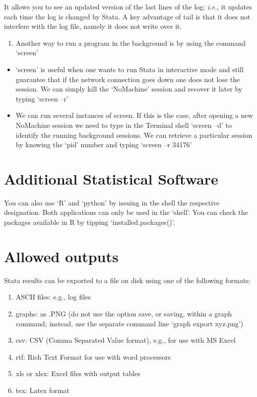 \documentclass[]{book}
\providecommand{\tightlist}{%
  \setlength{\itemsep}{0pt}\setlength{\parskip}{0pt}}
\begin{document}
It allows you to see an updated version of the last lines of the log;
\emph{i.e.}, it updates each time the log is changed by Stata. A key
advantage of tail is that it does not interfere with the log file,
namely it does not write over it.

\begin{enumerate}
\def\labelenumi{\arabic{enumi}.}
\setcounter{enumi}{14}
\tightlist
\item
  Another way to run a program in the background is by using the
  command `screen'
\end{enumerate}

\begin{itemize}
\item
  `screen' is useful when one wants to run Stata in interactive
  mode and still guarantee that if the network connection goes
  down one does not lose the session. We can simply kill the
  `NoMachine' session and recover it later by typing `screen
  --r'
\item
  We can run several instances of screen. If this is the case,
  after opening a new NoMachine session we need to type in the
  Terminal shell `screen --d' to identify the running background
  sessions. We can retrieve a particular session by knowing the
  `pid' number and typing `screen --r 34176'
\end{itemize}

\hypertarget{additional-statistical-software}{%
\section{\texorpdfstring{{Additional Statistical Software}}{Additional Statistical Software}}\label{additional-statistical-software}}

You can also use `R' and `python' by issuing in the shell the
respective designation. Both applications can only be used in the
`shell'. You can check the packages available in R by tipping
`installed.packages()'.

\hypertarget{allowed-outputs}{%
\section{\texorpdfstring{{Allowed outputs}}{Allowed outputs}}\label{allowed-outputs}}

Stata results can be exported to a file on disk using one of the following formats:

\begin{enumerate}
\def\labelenumi{\arabic{enumi}.}
\item
  ASCII files: e.g., log files
\item
  graphs: as .PNG (do not use the option save, or saving, within a
  graph command; instead, use the separate command line `graph export
  xyz.png')
\item
  csv: CSV (Comma Separated Value format), e.g., for use with MS Excel
\item
  rtf: Rich Text Format for use with word processors
\item
  xls or xlsx: Excel files with output tables
\item
  tex: Latex format
\end{enumerate}
\end{document}
